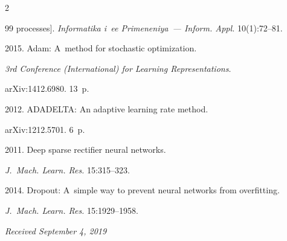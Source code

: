 \begin{multicols}{2}
{{\begin{thebibliography}{99}
processes].  \textit{Informatika i~ee Primeneniya~--- Inform. Appl.} 10(1):72--81.




 2015. Adam: A~method for stochastic optimization. 

 \textit{3rd Conference (International) for Learning Representations}. 

 arXiv:1412.6980. 13~p.




 2012. ADADELTA: An adaptive learning rate method. 

arXiv:1212.5701. 6~p.





2011. Deep sparse rectifier neural networks.

 \textit{J.~Mach. Learn. Res.} 15:315--323.





 2014. Dropout: A~simple way to prevent neural networks from overfitting.

 \textit{J.~Mach. Learn. Res.} 15:1929--1958.

 

 \end{thebibliography}



 }

 }



\end{multicols}






\hfill{\small\textit{Received September 4, 2019}}











\Contr





